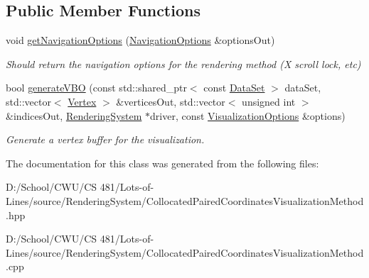 \subsection*{Public Member Functions}
\begin{DoxyCompactItemize}
\item 
void \hyperlink{class_lots_of_lines_1_1_collocated_paired_coordinates_visualization_method_adc262d91a1fb1972a3f7a4dcb6da5ef7}{get\+Navigation\+Options} (\hyperlink{struct_lots_of_lines_1_1_navigation_options}{Navigation\+Options} \&options\+Out)\hypertarget{class_lots_of_lines_1_1_collocated_paired_coordinates_visualization_method_adc262d91a1fb1972a3f7a4dcb6da5ef7}{}\label{class_lots_of_lines_1_1_collocated_paired_coordinates_visualization_method_adc262d91a1fb1972a3f7a4dcb6da5ef7}

\begin{DoxyCompactList}\small\item\em Should return the navigation options for the rendering method (X scroll lock, etc) \end{DoxyCompactList}\item 
bool \hyperlink{class_lots_of_lines_1_1_collocated_paired_coordinates_visualization_method_aa2fc5876109a7fbc2f3e66dde6de8582}{generate\+V\+BO} (const std\+::shared\+\_\+ptr$<$ const \hyperlink{class_lots_of_lines_1_1_data_set}{Data\+Set} $>$ data\+Set, std\+::vector$<$ \hyperlink{struct_lots_of_lines_1_1_vertex}{Vertex} $>$ \&vertices\+Out, std\+::vector$<$ unsigned int $>$ \&indices\+Out, \hyperlink{class_lots_of_lines_1_1_rendering_system}{Rendering\+System} $\ast$driver, const \hyperlink{class_lots_of_lines_1_1_visualization_options}{Visualization\+Options} \&options)\hypertarget{class_lots_of_lines_1_1_collocated_paired_coordinates_visualization_method_aa2fc5876109a7fbc2f3e66dde6de8582}{}\label{class_lots_of_lines_1_1_collocated_paired_coordinates_visualization_method_aa2fc5876109a7fbc2f3e66dde6de8582}

\begin{DoxyCompactList}\small\item\em Generate a vertex buffer for the visualization. \end{DoxyCompactList}\end{DoxyCompactItemize}


The documentation for this class was generated from the following files\+:\begin{DoxyCompactItemize}
\item 
D\+:/\+School/\+C\+W\+U/\+C\+S 481/\+Lots-\/of-\/\+Lines/source/\+Rendering\+System/Collocated\+Paired\+Coordinates\+Visualization\+Method.\+hpp\item 
D\+:/\+School/\+C\+W\+U/\+C\+S 481/\+Lots-\/of-\/\+Lines/source/\+Rendering\+System/Collocated\+Paired\+Coordinates\+Visualization\+Method.\+cpp\end{DoxyCompactItemize}
